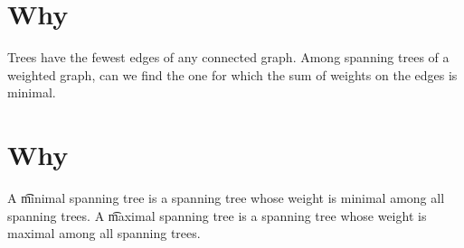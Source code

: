 
\section*{Why}

Trees have the fewest edges of any connected graph.
Among spanning trees of a weighted graph, can we find the one for which the sum of weights on the edges is minimal.

\section*{Why}

A \t{minimal spanning tree} is a spanning tree whose weight is minimal among all spanning trees.
A \t{maximal spanning tree} is a spanning tree whose weight is maximal among all spanning trees.

\blankpage